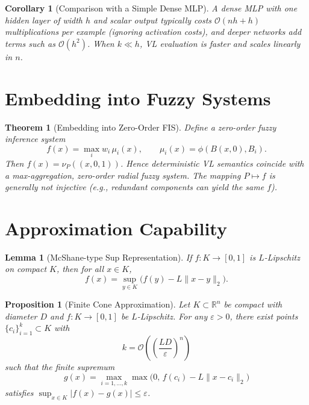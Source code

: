 \documentclass[11pt]{article}
\newtheorem{proposition}{Proposition}
\newtheorem{theorem}{Theorem}
\newtheorem{lemma}{Lemma}
\newtheorem{corollary}{Corollary}
\begin{document}
\begin{corollary}[Comparison with a Simple Dense MLP]
A dense MLP with one hidden layer of width $h$ and scalar output typically costs $\mathcal{O}(nh+h)$ multiplications per example (ignoring activation costs), and deeper networks add terms such as $\mathcal{O}(h^2)$. When $k\ll h$, VL evaluation is faster and scales linearly in $n$.
\end{corollary}

\section{Embedding into Fuzzy Systems}

\begin{theorem}[Embedding into Zero-Order FIS]
Define a zero-order fuzzy inference system
\begin{equation}
f(x)=\max_i w_i\,\mu_i(x),\qquad \mu_i(x)=\phi(B(x,0),B_i).
\end{equation}
Then $f(x)=\nu_P((x,0,1))$. Hence deterministic VL semantics coincide with a max-aggregation, zero-order radial fuzzy system. The mapping $P\mapsto f$ is generally not injective (e.g., redundant components can yield the same $f$).
\end{theorem}

\section{Approximation Capability}

\begin{lemma}[McShane-type Sup Representation]
If $f:K\to[0,1]$ is $L$-Lipschitz on compact $K$, then for all $x\in K$,
\begin{equation}
f(x)=\sup_{y\in K}\big(f(y)-L\|x-y\|_2\big).
\end{equation}
\end{lemma}

\begin{proposition}[Finite Cone Approximation]
Let $K\subset \mathbb{R}^n$ be compact with diameter $D$ and $f:K\to[0,1]$ be $L$-Lipschitz. For any $\varepsilon>0$, there exist points $\{c_i\}_{i=1}^k\subset K$ with
\begin{equation}
k=\mathcal{O}\!\left(\left(\frac{LD}{\varepsilon}\right)^n\right)
\end{equation}
such that the finite supremum
\begin{equation}
g(x)=\max_{i=1,\dots,k}\max\big(0,\, f(c_i)-L\|x-c_i\|_2\big)
\end{equation}
satisfies $\sup_{x\in K}|f(x)-g(x)|\le \varepsilon$.
\end{proposition}
\end{document}
